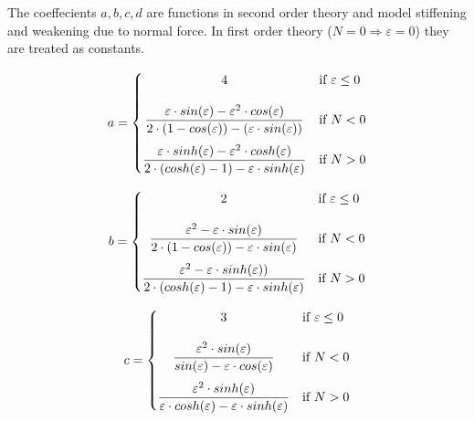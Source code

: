 The coeffecients $a, b, c ,d$ are functions in second order theory and model stiffening and weakening due to normal force.
In first order theory ($N = 0 \Rightarrow \varepsilon = 0$) they are treated as constants.

\begin{equation} \label{a}
    a = \begin{cases}
            \hfil 4              & \text{if } \varepsilon \leq 0\\[1.2em]
            \hfil \dfrac{\varepsilon \cdot sin(\varepsilon) - \varepsilon^2 \cdot cos(\varepsilon)}{2 \cdot (1 - cos(\varepsilon)) - (\varepsilon \cdot sin(\varepsilon))}               & \text{if } N < 0          \\[1.2em]
            \dfrac{\varepsilon \cdot sinh(\varepsilon) - \varepsilon^2 \cdot cosh(\varepsilon)}{2 \cdot (cosh(\varepsilon) - 1) - \varepsilon \cdot sinh(\varepsilon)}               & \text{if } N > 0
        \end{cases}
\end{equation}

\begin{equation} \label{b}
    b = \begin{cases}
            \hfil 2              & \text{if } \varepsilon \leq 0\\[1.2em]
            \hfil \dfrac{\varepsilon^2 - \varepsilon \cdot sin(\varepsilon)}{2\cdot(1 - cos(\varepsilon)) - \varepsilon \cdot sin(\varepsilon) }               & \text{if } N < 0          \\[1.2em]
            \dfrac{\varepsilon^2 - \varepsilon \cdot sinh(\varepsilon))}{2 \cdot (cosh(\varepsilon) - 1) - \varepsilon \cdot sinh(\varepsilon)}               & \text{if } N > 0
        \end{cases}
\end{equation}

\begin{equation} \label{c}
    c = \begin{cases}
            \hfil 3              & \text{if } \varepsilon \leq 0\\[1.2em]
            \hfil \dfrac{\varepsilon^2 \cdot sin(\varepsilon)}{sin(\varepsilon) - \varepsilon \cdot cos(\varepsilon)}               & \text{if } N < 0          \\[1.2em]
            \dfrac{\varepsilon^2 \cdot sinh(\varepsilon)}{\varepsilon \cdot cosh(\varepsilon) - \varepsilon \cdot sinh(\varepsilon)}               & \text{if } N > 0
        \end{cases}
\end{equation}

